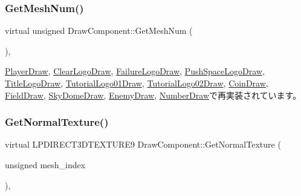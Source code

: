 \mbox{\label{class_draw_component_a5f3bbcc8e563b740c0a5535170921c75}} 
\subsubsection{\texorpdfstring{Get\+Mesh\+Num()}{GetMeshNum()}}
{\footnotesize\ttfamily virtual unsigned Draw\+Component\+::\+Get\+Mesh\+Num (\begin{DoxyParamCaption}{ }\end{DoxyParamCaption})\hspace{0.3cm}{\ttfamily [inline]}, {\ttfamily [virtual]}}



\mbox{\hyperlink{class_player_draw_adbf5776a7a2d7f255661e0527f673eaa}{Player\+Draw}}, \mbox{\hyperlink{class_clear_logo_draw_aac55b995c8003022b4e308da81c904b3}{Clear\+Logo\+Draw}}, \mbox{\hyperlink{class_failure_logo_draw_a169800b9298e3186ef8b4aa82347e38e}{Failure\+Logo\+Draw}}, \mbox{\hyperlink{class_push_space_logo_draw_ac6e2e4f3158976693efaa2c1f351050f}{Push\+Space\+Logo\+Draw}}, \mbox{\hyperlink{class_title_logo_draw_a882f0521f65845529e5bf45d3671d9c4}{Title\+Logo\+Draw}}, \mbox{\hyperlink{class_tutorial_logo01_draw_a08c17ba99169d9e8e57f9bc23d96c21c}{Tutorial\+Logo01\+Draw}}, \mbox{\hyperlink{class_tutorial_logo02_draw_aadb36d767f9cca619453885dacdff836}{Tutorial\+Logo02\+Draw}}, \mbox{\hyperlink{class_coin_draw_a9f5aa847fcb28e5617f00d575a6a911c}{Coin\+Draw}}, \mbox{\hyperlink{class_field_draw_a8637a3a4d08d0ac466a370edac39b584}{Field\+Draw}}, \mbox{\hyperlink{class_sky_dome_draw_a3509ab1acfc388e652a8146b8ad027b5}{Sky\+Dome\+Draw}}, \mbox{\hyperlink{class_enemy_draw_af61c817f8c00dae7aa990544721a2e15}{Enemy\+Draw}}, \mbox{\hyperlink{class_number_draw_ace379e39f5646b4d04f3fc9cc1beea1a}{Number\+Draw}}で再実装されています。

\mbox{\label{class_draw_component_a03b739c28b9abcff3a3e5bda6bcc2060}} 
\subsubsection{\texorpdfstring{Get\+Normal\+Texture()}{GetNormalTexture()}}
{\footnotesize\ttfamily virtual L\+P\+D\+I\+R\+E\+C\+T3\+D\+T\+E\+X\+T\+U\+R\+E9 Draw\+Component\+::\+Get\+Normal\+Texture (\begin{DoxyParamCaption}\item[{unsigned}]{mesh\+\_\+index }\end{DoxyParamCaption})\hspace{0.3cm}{\ttfamily [inline]}, {\ttfamily [virtual]}}



